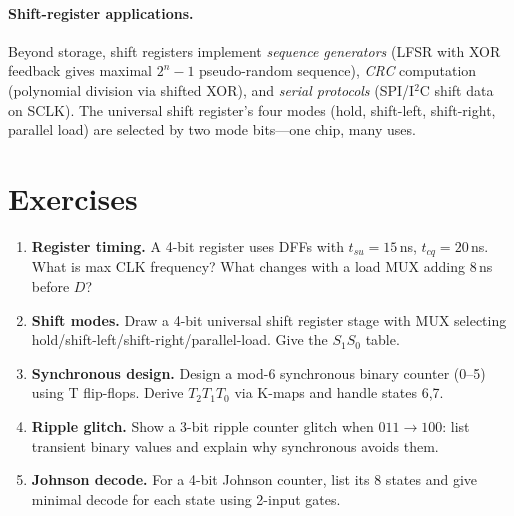 
\paragraph{Shift-register applications.} Beyond storage, shift registers implement \emph{sequence generators}
(LFSR with XOR feedback gives maximal $2^n-1$ pseudo-random sequence), \emph{CRC} computation (polynomial division
via shifted XOR), and \emph{serial protocols} (SPI/I$^2$C shift data on SCLK). The universal shift register's four
modes (hold, shift-left, shift-right, parallel load) are selected by two mode bits---one chip, many uses.

\section{Exercises}
\label{sec:ch06-exercises}
\begin{enumerate}[label=E6.\arabic*, leftmargin=*, itemsep=0.8em]
    \item \textbf{Register timing.} A 4-bit register uses DFFs with $t_{su}=15$\,ns, $t_{cq}=20$\,ns. What is max CLK frequency? What changes with a load MUX adding 8\,ns before $D$?
    \item \textbf{Shift modes.} Draw a 4-bit universal shift register stage with MUX selecting hold/shift-left/shift-right/parallel-load. Give the $S_1S_0$ table.
    \item \textbf{Synchronous design.} Design a mod-6 synchronous binary counter (0--5) using T flip-flops. Derive $T_2T_1T_0$ via K-maps and handle states 6,7.
    \item \textbf{Ripple glitch.} Show a 3-bit ripple counter glitch when $011\to100$: list transient binary values and explain why synchronous avoids them.
    \item \textbf{Johnson decode.} For a 4-bit Johnson counter, list its $8$ states and give minimal decode for each state using 2-input gates.
\end{enumerate}
